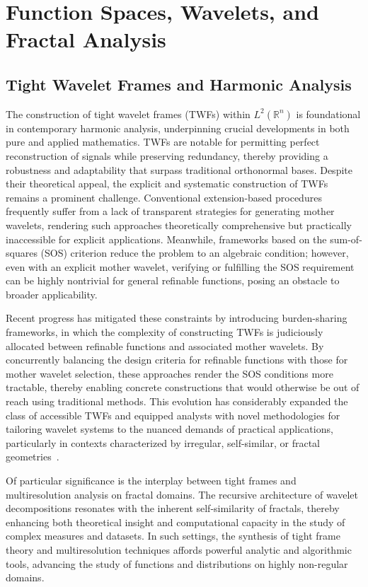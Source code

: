 \section{Function Spaces, Wavelets, and Fractal Analysis}

\subsection{Tight Wavelet Frames and Harmonic Analysis}

The construction of tight wavelet frames (TWFs) within $L^2(\mathbb{R}^n)$ is foundational in contemporary harmonic analysis, underpinning crucial developments in both pure and applied mathematics. TWFs are notable for permitting perfect reconstruction of signals while preserving redundancy, thereby providing a robustness and adaptability that surpass traditional orthonormal bases. Despite their theoretical appeal, the explicit and systematic construction of TWFs remains a prominent challenge. Conventional extension-based procedures frequently suffer from a lack of transparent strategies for generating mother wavelets, rendering such approaches theoretically comprehensive but practically inaccessible for explicit applications. Meanwhile, frameworks based on the sum-of-squares (SOS) criterion reduce the problem to an algebraic condition; however, even with an explicit mother wavelet, verifying or fulfilling the SOS requirement can be highly nontrivial for general refinable functions, posing an obstacle to broader applicability.

Recent progress has mitigated these constraints by introducing burden-sharing frameworks, in which the complexity of constructing TWFs is judiciously allocated between refinable functions and associated mother wavelets. By concurrently balancing the design criteria for refinable functions with those for mother wavelet selection, these approaches render the SOS conditions more tractable, thereby enabling concrete constructions that would otherwise be out of reach using traditional methods. This evolution has considerably expanded the class of accessible TWFs and equipped analysts with novel methodologies for tailoring wavelet systems to the nuanced demands of practical applications, particularly in contexts characterized by irregular, self-similar, or fractal geometries~\cite{ref104}.

Of particular significance is the interplay between tight frames and multiresolution analysis on fractal domains. The recursive architecture of wavelet decompositions resonates with the inherent self-similarity of fractals, thereby enhancing both theoretical insight and computational capacity in the study of complex measures and datasets. In such settings, the synthesis of tight frame theory and multiresolution techniques affords powerful analytic and algorithmic tools, advancing the study of functions and distributions on highly non-regular domains.

